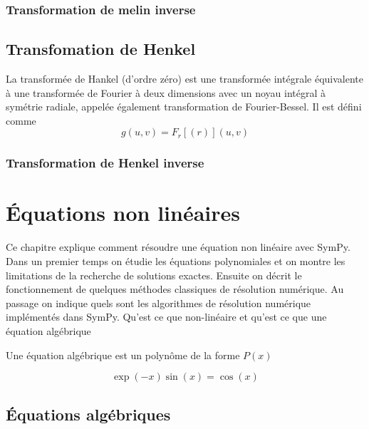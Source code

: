  \subsection{Transformation de melin inverse}
 \section{Transfomation de Henkel}
 La transformée de Hankel (d'ordre zéro) est une transformée intégrale équivalente à une transformée de Fourier à deux dimensions avec un noyau intégral à symétrie radiale, appelée également transformation de Fourier-Bessel. Il est défini comme
 \[
 g \left(u, v \right)	= F_{r}\left[\left(r\right)\right]\left(u, v\right)
 \]
 \subsection{Transformation de Henkel inverse}
 
\chapter{Équations non linéaires}
Ce chapitre explique comment résoudre une équation non linéaire avec SymPy.
Dans un premier temps on étudie les équations polynomiales et on montre les
limitations de la recherche de solutions exactes. Ensuite on décrit le fonctionnement
de quelques méthodes classiques de résolution numérique. Au passage on indique
quels sont les algorithmes de résolution numérique implémentés dans SymPy.
Qu'est ce que non-linéaire et qu'est ce que une \'equation alg\'ebrique

Une \'equation alg\'ebrique est un polyn\^ome de la forme $P(x)$

\begin{equation}
\exp(-x)\sin(x) = \cos(x)
\end{equation}
\section{Équations algébriques}